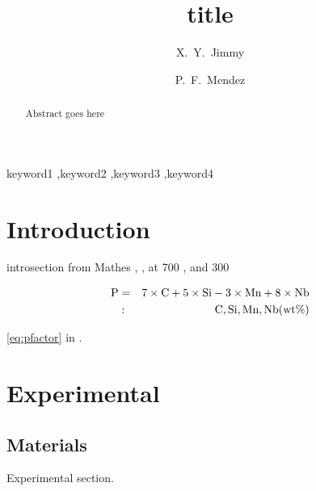 \documentclass[review, 1p, number, sort&compress,table]{elsarticle}
\begin{document}
	\begin{frontmatter}
	
		\title{title}
		
		\author[UoA]{X.~Y.~Jimmy}

		
		\author[UoA]{P.~F.~Mendez}
		
		
		\address[UoA]{Department of Chemical and Materials Engineering, University of Alberta, Edmonton, Alberta,T6G 2V4, Canada}
	
		\begin{abstract}
			Abstract goes here
		\end{abstract}
		
		\begin{keyword}
			keyword1 \sep keyword2 \sep keyword3 \sep keyword4
		\end{keyword}

	\end{frontmatter}
	

	\section{Introduction}
		\indent introsection from  Mathes \etal, \cite{MOR91, texbook}, at 700 \celcius, and 300\um
		
		\small
		\begin{eqnarray}
		\label{eq:pfactor}
			\rm P&=&\rm{}7\times C + 5 \times Si - 3 \times Mn + 8 \times Nb \\ 
			  &:&\rm C,Si,Mn,Nb(wt\%)\nonumber
		\end{eqnarray}
		\normalsize
		
		 \autoref{eq:pfactor} in \cite{dB93}.           
		
  		
	\section{Experimental}\label{sec:experimental}
	  \subsection{Materials}
	  	Experimental section. 
			
\end{document}
